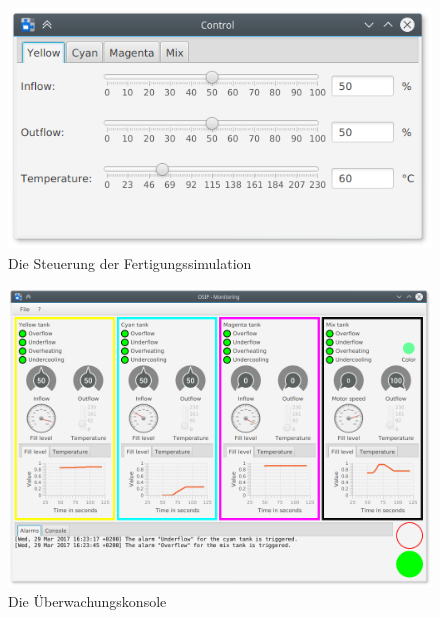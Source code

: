 \documentclass[parskip=full]{scrartcl}
\begin{document}
\begin{figure}[H]
    \centering
    \includegraphics[scale=0.6]{../media/screenshot-control.png}
    \caption{Die Steuerung der Fertigungssimulation}
\end{figure}

\begin{figure}[H]
    \centering
    \includegraphics[scale=0.55]{../media/screenshot-monitoring.png}
    \caption{Die Überwachungskonsole}
\end{figure}

\pagebreak
{}
{}
\listoffigures
\end{document}
